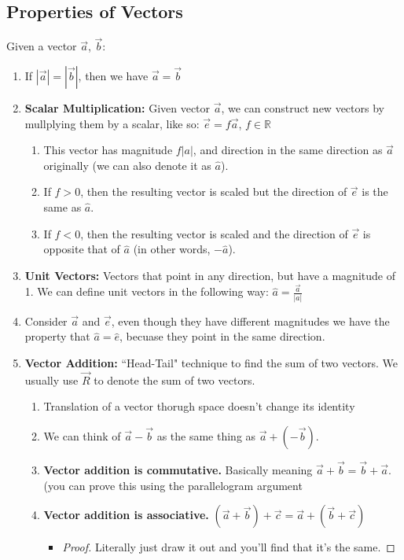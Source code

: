 \documentclass{article}
\theoremstyle{definition}
\numberwithin{equation}{section}
\numberwithin{definition}{section}
\begin{document}
\subsection{Properties of Vectors}

Given a vector $\vec{a}$, $\vec{b}$:

\begin{enumerate}
	\item If $|\vec{a}| = |\vec{b}|$, then we have $\vec{a} = \vec{b}$
	\item \textbf{Scalar Multiplication:} Given vector $\vec{a}$, we can construct new vectors by mullplying them by a scalar, like so: $\vec{e} = f \vec{a}$, $f \in \mathbb{R}$
	\begin{enumerate}
		\item This vector has magnitude $f|a|$, and direction in the same direction as $\vec{a}$ originally (we can also denote it as $\hat{a}$).
		\item If $f > 0$, then the resulting vector is scaled but the direction of $\vec{e}$ is the same as $\hat{a}$.
		\item If $f < 0$, then the resulting vector is scaled and the direction of $\vec{e}$ is opposite that of $\hat{a}$ (in other words, $-\hat{a}$).
	\end{enumerate}
	\item \textbf{Unit Vectors:} Vectors that point in any direction, but have a magnitude of 1. We can define unit vectors in the following way: $\hat{a} = \frac{\vec{a}}{|a|}$
	\item Consider $\vec{a}$ and $\vec{e}$, even though they have different magnitudes we have the property that $\hat{a} = \hat{e}$, becuase they point in the same direction.
	\item \textbf{Vector Addition:} ``Head-Tail" technique to find the sum of two vectors. We usually use $\vec{R}$ to denote the sum of two vectors.
	\begin{enumerate}
		\item Translation of a vector thorugh space doesn't change its identity
		\item We can think of $\vec{a} - \vec{b}$ as the same thing as $\vec{a} + (-\vec{b})$.
		\item \textbf{Vector addition is commutative.} Basically meaning $\vec{a} + \vec{b} = \vec{b} + \vec{a}$. (you can prove this using the parallelogram argument
		\item \textbf{Vector addition is associative.} $(\vec{a} + \vec{b}) + \vec{c} = \vec{a} + (\vec{b} + \vec{c})$ 
		\begin{itemize}
		\item	\begin{proof}
				Literally just draw it out and you'll find that it's the same.
			\end{proof}
			\end{itemize}
		

\end{enumerate}
\end{enumerate}
\end{document}
